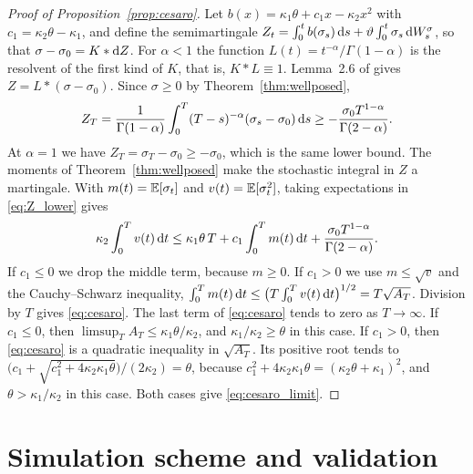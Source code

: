 \begin{proof}[Proof of Proposition~\ref{prop:cesaro}] Let $b(x)=\kappa_1\theta+c_1x-\kappa_2x^2$ with $c_1=\kappa_2\theta-\kappa_1$, and define the semimartingale $Z_t=\int_0^tb(\sigma_s)\,\mathrm{d} s+\vartheta\int_0^t\sigma_s\,\mathrm{d} W^\sigma_s$, so that $\sigma-\sigma_0=K*\mathrm{d} Z$. For $\alpha<1$ the function $L(t)=t^{-\alpha}/\Gamma(1-\alpha)$ is the resolvent of the first kind of $K$, that is, $K*L\equiv1$. Lemma~2.6 of \citet{AbiJaberLarssonPulido2019} gives $Z=L*(\sigma-\sigma_0)$. Since $\sigma\ge0$ by Theorem~\ref{thm:wellposed},
\begin{equation}\label{eq:Z_lower}
Z_T=\frac{1}{\Gamma(1-\alpha)}\int_0^T(T-s)^{-\alpha}(\sigma_s-\sigma_0)\,\D s\ge-\frac{\sigma_0T^{1-\alpha}}{\Gamma(2-\alpha)} .
\end{equation}
At $\alpha=1$ we have $Z_T=\sigma_T-\sigma_0\ge-\sigma_0$, which is the same lower bound. The moments of Theorem~\ref{thm:wellposed} make the stochastic integral in $Z$ a martingale. With $m(t)=\mathbb{E}[\sigma_t]$ and $v(t)=\mathbb{E}[\sigma_t^2]$, taking expectations in \eqref{eq:Z_lower} gives
\begin{equation*}
\kappa_2\int_0^Tv(t)\,\mathrm{d} t\le\kappa_1\theta\,T+c_1\int_0^Tm(t)\,\mathrm{d} t+\frac{\sigma_0T^{1-\alpha}}{\Gamma(2-\alpha)} .
\end{equation*}
If $c_1\le0$ we drop the middle term, because $m\ge0$. If $c_1>0$ we use $m\le\sqrt v$ and the Cauchy--Schwarz inequality, $\int_0^Tm(t)\,\mathrm{d} t\le\big(T\int_0^Tv(t)\,\mathrm{d} t\big)^{1/2}=T\sqrt{A_T}$. Division by $T$ gives \eqref{eq:cesaro}. The last term of \eqref{eq:cesaro} tends to zero as $T\to\infty$. If $c_1\le0$, then $\limsup_TA_T\le\kappa_1\theta/\kappa_2$, and $\kappa_1/\kappa_2\ge\theta$ in this case. If $c_1>0$, then \eqref{eq:cesaro} is a quadratic inequality in $\sqrt{A_T}$. Its positive root tends to $\big(c_1+\sqrt{c_1^2+4\kappa_2\kappa_1\theta}\big)/(2\kappa_2)=\theta$, because $c_1^2+4\kappa_2\kappa_1\theta=(\kappa_2\theta+\kappa_1)^2$, and $\theta>\kappa_1/\kappa_2$ in this case. Both cases give \eqref{eq:cesaro_limit}.
\end{proof}

\section{Simulation scheme and validation}\label{app:simulation}

